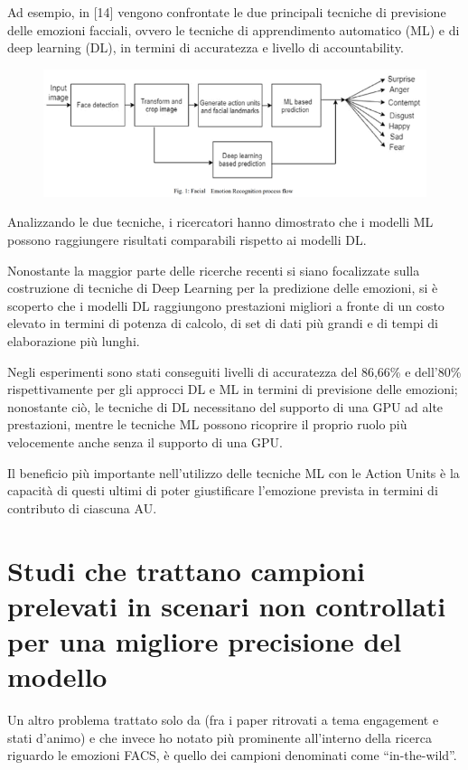 Ad esempio, in [14] vengono confrontate le due principali tecniche di previsione delle emozioni facciali, ovvero le tecniche di apprendimento automatico (ML) e di deep learning (DL), in termini di accuratezza e livello di accountability. 
\begin{figure}
    \begin{center}    
        \includegraphics[width=1\linewidth]{images/23.png}
    \end{center}
\end{figure}

Analizzando le due tecniche, i ricercatori hanno dimostrato che i modelli ML possono raggiungere risultati comparabili rispetto ai modelli DL. 

Nonostante la maggior parte delle ricerche recenti si siano focalizzate sulla costruzione di tecniche di Deep Learning per la predizione delle emozioni, si è scoperto che i modelli DL raggiungono prestazioni migliori a fronte di un costo elevato in termini di potenza di calcolo, di set di dati più grandi e di tempi di elaborazione più lunghi. 

Negli esperimenti sono stati conseguiti livelli di accuratezza del 86,66\% e dell'80\% rispettivamente per gli approcci DL e ML in termini di previsione delle emozioni; nonostante ciò, le tecniche di DL necessitano del supporto di una GPU ad alte prestazioni, mentre le tecniche ML possono ricoprire il proprio ruolo più velocemente anche senza il supporto di una GPU. 

Il beneficio più importante nell'utilizzo delle tecniche ML con le Action Units è la capacità di questi ultimi di poter giustificare l'emozione prevista in termini di contributo di ciascuna AU. 


\section{Studi che trattano campioni prelevati in scenari non controllati per una migliore precisione del modello}

Un altro problema trattato solo da \cite{PredLocStudEngagInTheWild} (fra i paper ritrovati a tema engagement e stati d’animo) e che invece ho notato più prominente all’interno della ricerca riguardo le emozioni FACS, è quello dei campioni denominati come “in-the-wild”.

